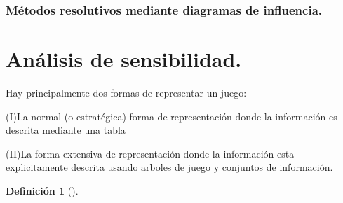 \documentclass[a4paper]{report} %
\newtheorem{definicion}{Definición}[section]
\begin{document}
\subsubsection{Métodos resolutivos mediante diagramas de influencia.}


\section{Análisis de sensibilidad.}
Hay principalmente dos formas de representar un juego:


(I)La normal (o estratégica) forma de representación donde la información es descrita mediante una tabla


(II)La forma extensiva de representación donde la información esta explicitamente descrita usando arboles de juego y conjuntos de información.

\cite{MasColell1997}

\begin{definicion}[]

\end{definicion}


\newpage

\printbibliography

\end{document}
